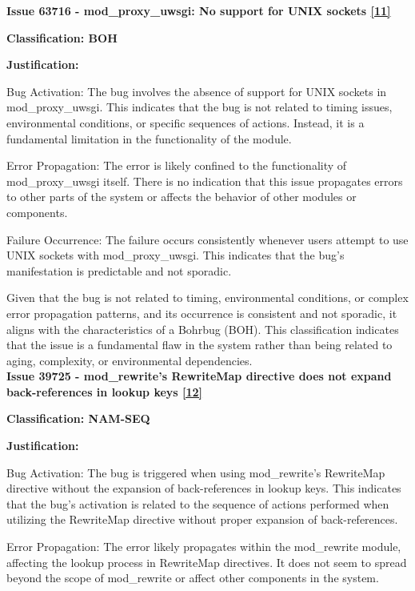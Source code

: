 \documentclass[12pt]{article}
\numberwithin{table}{section}
\begin{document}
	\textbf{Issue 63716 - mod\_proxy\_uwsgi: No support for UNIX sockets \href{https://bz.apache.org/bugzilla/show_bug.cgi?id=63716}{[11]}}
	
	\textbf{Classification: BOH}
	
	\textbf{Justification:}
	
	Bug Activation: The bug involves the absence of support for UNIX sockets in mod\_proxy\_uwsgi. This indicates that the bug is not related to timing issues, environmental conditions, or specific sequences of actions. Instead, it is a fundamental limitation in the functionality of the module.
	
	Error Propagation: The error is likely confined to the functionality of mod\_proxy\_uwsgi itself. There is no indication that this issue propagates errors to other parts of the system or affects the behavior of other modules or components.
	
	Failure Occurrence: The failure occurs consistently whenever users attempt to use UNIX sockets with mod\_proxy\_uwsgi. This indicates that the bug's manifestation is predictable and not sporadic.
	
	Given that the bug is not related to timing, environmental conditions, or complex error propagation patterns, and its occurrence is consistent and not sporadic, it aligns with the characteristics of a Bohrbug (BOH). This classification indicates that the issue is a fundamental flaw in the system rather than being related to aging, complexity, or environmental dependencies.\\
	
	\textbf{Issue 39725 - mod\_rewrite's RewriteMap directive does not expand back-references in lookup keys \href{https://bz.apache.org/bugzilla/show_bug.cgi?id=39725}{[12]}}
	
	\textbf{Classification: NAM-SEQ}
	
	\textbf{Justification:}
	
	Bug Activation: The bug is triggered when using mod\_rewrite's RewriteMap directive without the expansion of back-references in lookup keys. This indicates that the bug's activation is related to the sequence of actions performed when utilizing the RewriteMap directive without proper expansion of back-references.
	
	Error Propagation: The error likely propagates within the mod\_rewrite module, affecting the lookup process in RewriteMap directives. It does not seem to spread beyond the scope of mod\_rewrite or affect other components in the system.
	
\end{document}
